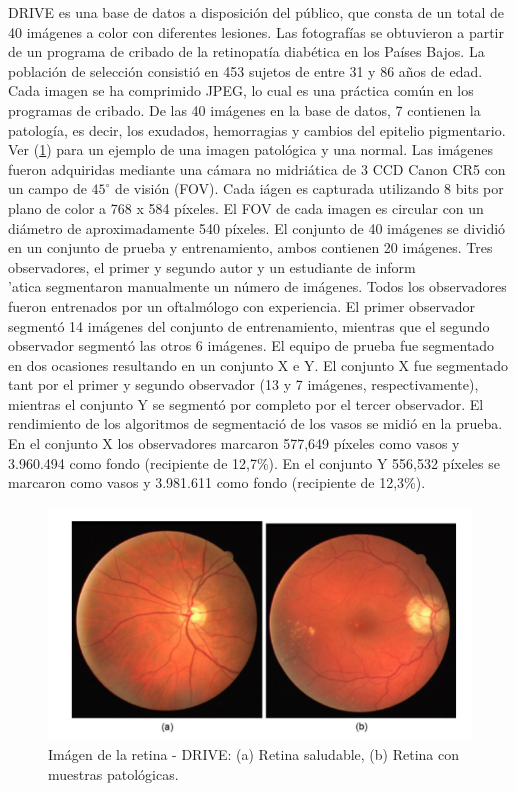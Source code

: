 DRIVE es una base de datos a disposici\'on del p\'ublico, que consta de un total de 40 im\'agenes a color con diferentes lesiones. Las fotograf\'ias se obtuvieron a partir de un programa de cribado de la retinopat\'ia diab\'etica en los Pa\'ises Bajos. La poblaci\'on de selecci\'on consisti\'o en 453 sujetos de entre 31 y 86 a\~nos de edad. Cada imagen se ha comprimido JPEG, lo cual es una pr\'actica com\'un en los programas de cribado. De las 40 im\'agenes en la base de datos, 7 contienen la patolog\'ia, es decir, los exudados, hemorragias y cambios del epitelio pigmentario. Ver (\ref{fig:Drive_images_retinal}) para un ejemplo de una imagen patológica y una normal. Las im\'agenes fueron adquiridas mediante una c\'amara no midriática de 3 CCD Canon CR5 con un campo de $45^{\circ}$ de visi\'on (FOV). Cada i\'agen es capturada utilizando 8 bits por plano de color a 768 {x} 584 p\'ixeles. El FOV de cada imagen es circular con un di\'ametro de aproximadamente 540 p\'ixeles. El conjunto de 40 im\'agenes se dividi\'o en un conjunto de prueba y entrenamiento, ambos contienen 20 im\'agenes. Tres observadores, el primer y segundo autor y un estudiante de inform\\'atica segmentaron manualmente un n\'umero de im\'agenes. Todos los observadores fueron entrenados por un oftalm\'ologo con experiencia. El primer observador segment\'o 14 im\'agenes del conjunto de entrenamiento, mientras que el segundo observador segment\'o las otros 6 im\'agenes. El equipo de prueba fue segmentado en dos ocasiones resultando en un conjunto X e Y. El conjunto X fue segmentado tant por el primer y segundo observador (13 y 7 im\'agenes, respectivamente), mientras el conjunto Y se segmentó por completo por el tercer observador. El rendimiento de los algoritmos de segmentaci\'o de los vasos se midi\'o en la prueba. En el conjunto X los observadores marcaron 577,649 p\'ixeles como vasos y 3.960.494 como fondo (recipiente de 12,7\%). En el conjunto Y 556,532 p\'ixeles se marcaron como vasos y 3.981.611 como fondo (recipiente de 12,3\%).\\


\begin{figure}[H]
	{
	\centering
	\includegraphics[width=1\textwidth]{Figures/Drive_images_retinal}
	\caption[Drive]{Im\'agen de la retina - DRIVE: (a) Retina saludable, (b) Retina con muestras patol\'ogicas.}
	\label{fig:Drive_images_retinal}
	}
\end{figure}	


